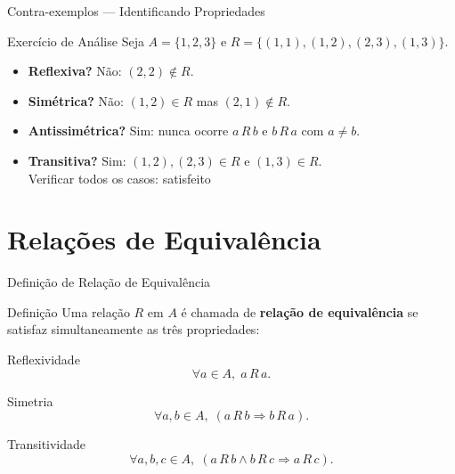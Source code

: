 \documentclass[9pt]{beamer}
\begin{document}
\begin{frame}{Contra-exemplos — Identificando Propriedades}

\begin{block}{Exercício de Análise}
Seja $A = \{1,2,3\}$ e $R = \{(1,1),(1,2),(2,3),(1,3)\}$.
\begin{itemize}
  \item \textbf{Reflexiva?} Não: $(2,2) \notin R$.
  \item \textbf{Simétrica?} Não: $(1,2) \in R$ mas $(2,1) \notin R$.
  \item \textbf{Antissimétrica?} Sim: nunca ocorre $a\,R\,b$ e $b\,R\,a$ com $a \neq b$.
  \item \textbf{Transitiva?} Sim: $(1,2),(2,3) \in R$ e $(1,3) \in R$. \\
  \quad Verificar todos os casos: satisfeito \checkmark
\end{itemize}
\end{block}

\end{frame}

\section{Relações de Equivalência}

\begin{frame}{Definição de Relação de Equivalência}

\begin{block}{Definição}
Uma relação $R$ em $A$ é chamada de \textbf{relação de equivalência} se satisfaz simultaneamente as três propriedades:
\end{block}

\begin{block}{Reflexividade}
\[
\forall a \in A,\; a\,R\,a.
\]
\end{block}

\begin{block}{Simetria}
\[
\forall a,b \in A,\; (a\,R\,b \Rightarrow b\,R\,a).
\]
\end{block}

\begin{block}{Transitividade}
\[
\forall a,b,c \in A,\; (a\,R\,b \land b\,R\,c \Rightarrow a\,R\,c).
\]
\end{block}

\end{frame}
\end{document}
